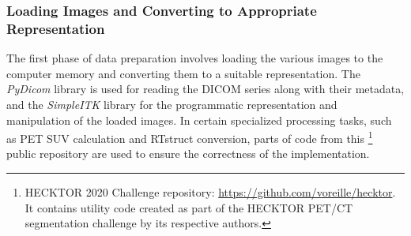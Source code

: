 \subsubsection{Loading Images and Converting to Appropriate Representation}
The first phase of data preparation involves loading the various images to the computer memory and converting them to a suitable representation. The \textit{PyDicom} library \cite{pydicom} is used for reading the DICOM series along with their metadata, and the \textit{SimpleITK} library \cite{lowekamp2013design} for the programmatic representation and manipulation of the loaded images. In certain specialized processing tasks, such as PET SUV calculation and RTstruct conversion, parts of code from this \footnote{HECKTOR 2020 Challenge repository: \url{https://github.com/voreille/hecktor}. It contains utility code created as part of the HECKTOR PET/CT segmentation challenge \cite{andrearczyk2020overview} by its respective authors.} public repository are used to ensure the correctness of the implementation.  


